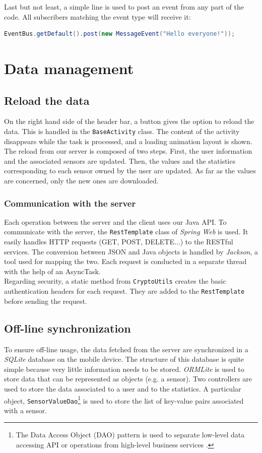 \documentclass[a4paper, oneside, 11pt]{book}
\begin{document}
Last but not least, a simple line is used to post an event from any part of the code. All subscribers matching the event type will receive it:
\begin{lstlisting}[language=java]
EventBus.getDefault().post(new MessageEvent("Hello everyone!"));
\end{lstlisting}

\section{Data management}

\subsection{Reload the data}
On the right hand side of the header bar, a button gives the option to reload the data. This is handled in the \texttt{BaseActivity} class. The content of the activity disappears while the task is processed, and a loading animation layout is shown.\\

The reload from our server is composed of two steps. First, the user information and the associated sensors are updated. Then, the values and the statistics corresponding to each sensor owned by the user are updated. As far as the values are concerned, only the new ones are downloaded.

\subsubsection{Communication with the server}
Each operation between the server and the client uses our Java API. To communicate with the server, the \texttt{RestTemplate} class of \textit{Spring Web} is used. It easily handles HTTP requests (GET, POST, DELETE...) to the RESTful services. The conversion between JSON and Java objects is handled by \textit{Jackson}, a tool used for mapping the two. Each request is conducted in a separate thread with the help of an AsyncTask.\\

Regarding security, a static method from \texttt{CryptoUtils} creates the basic authentication headers for each request. They are added to the \texttt{RestTemplate} before sending the request.

\subsection{Off-line synchronization}
To ensure off-line usage, the data fetched from the server are synchronized in a \textit{SQLite} database on the mobile device. The structure of this database is quite simple because very little information needs to be stored. \textit{ORMLite} is used to store data that can be represented as objects (e.g. a sensor). Two controllers are used to store the data associated to a user and to the statistics. A particular object, \texttt{SensorValueDao}\footnote{The Data Access Object (DAO) pattern is used to separate low-level data accessing API or operations from high-level business services \cite{DAO:online}.}  is used to store the list of key-value pairs associated with a sensor. \\
\end{document}
